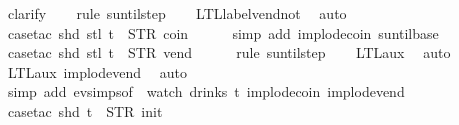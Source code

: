 \begin{isabellebody}
{\ clarify\isanewline
\ \ \isamarkupfalse%
\ {\isacharparenleft}rule\ suntil{\isachardot}step{\isacharparenright}\isanewline
\ \ \isamarkupfalse%
\ LTL{\isacharunderscore}label{\isacharunderscore}vend{\isacharunderscore}not{\isacharunderscore}{}\ \isamarkupfalse%
\ auto{\isacharbrackleft}{}{\isacharbrackright}\isanewline
\ \ \isamarkupfalse%
\ {\isacharparenleft}case{\isacharunderscore}tac\ {\isachardoublequoteopen}shd\ {\isacharparenleft}stl\ t{\isacharparenright}\ {\isacharequal}\ {\isacharparenleft}STR\ {\isacharprime}{\isacharprime}coin{\isacharprime}{\isacharprime}{\isacharcomma}\ {\isacharbrackleft}{\isacharbrackright}{\isacharparenright}{\isachardoublequoteclose}{\isacharparenright}\isanewline
\ \ \ \isamarkupfalse%
\ {\isacharparenleft}simp\ add{\isacharcolon}\ implode{\isacharunderscore}coin\ suntil{\isachardot}base{\isacharparenright}\isanewline
\ \ \isamarkupfalse%
\ {\isacharparenleft}case{\isacharunderscore}tac\ {\isachardoublequoteopen}shd\ {\isacharparenleft}stl\ t{\isacharparenright}\ {\isacharequal}\ {\isacharparenleft}STR\ {\isacharprime}{\isacharprime}vend{\isacharprime}{\isacharprime}{\isacharcomma}\ {\isacharbrackleft}{\isacharbrackright}{\isacharparenright}{\isachardoublequoteclose}{\isacharparenright}\isanewline
\ \ \ \isamarkupfalse%
\ {\isacharparenleft}rule\ suntil{\isachardot}step{\isacharparenright}\isanewline
\ \ \isamarkupfalse%
\ LTL{\isacharunderscore}aux{}\ \isamarkupfalse%
\ auto{\isacharbrackleft}{}{\isacharbrackright}\isanewline
\ \ \isamarkupfalse%
\ LTL{\isacharunderscore}aux{}\ implode{\isacharunderscore}vend\ \isamarkupfalse%
\ auto{\isacharbrackleft}{}{\isacharbrackright}\isanewline
\isanewline
\ \ \isamarkupfalse%
\ {\isacharparenleft}simp\ add{\isacharcolon}\ ev{\isachardot}simps{\isacharbrackleft}of\ {\isacharunderscore}\ {\isachardoublequoteopen}watch\ drinks\ t{\isachardoublequoteclose}{\isacharbrackright}\ implode{\isacharunderscore}coin\ implode{\isacharunderscore}vend{\isacharparenright}\isanewline
\ \ \isamarkupfalse%
\ {\isacharparenleft}case{\isacharunderscore}tac\ {\isachardoublequoteopen}shd\ t\ {\isacharequal}\ {\isacharparenleft}STR\ {\isacharprime}{\isacharprime}init{\isacharprime}{\isacharprime}{\isacharcomma}\ {\isacharbrackleft}{\isacharbrackright}{\isacharparenright}{\isachardoublequoteclose}{\isacharparenright}\isanewline
}
\end{isabellebody}
